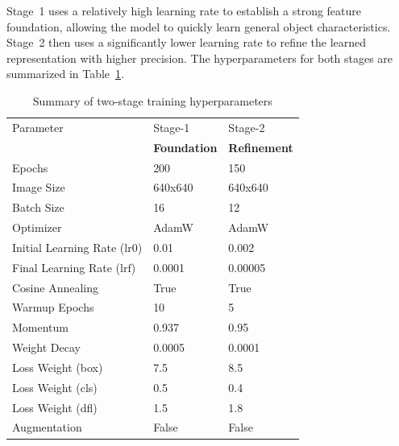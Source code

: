 \documentclass[journal,twoside,web]{ieeecolor}
\begin{document}
Stage~1 uses a relatively high learning rate to establish a strong feature foundation, allowing the model to quickly learn general object characteristics. Stage~2 then uses a significantly lower learning rate to refine the learned representation with higher precision. The hyperparameters for both stages are summarized in Table~\ref{tab:hyperparameters}. %


\begin{table}[t]
\centering
\caption{Summary of two-stage training hyperparameters}
\label{tab:hyperparameters}
\begin{tabular}{p{3cm} p{2.4cm} p{2cm}}
\toprule
{Parameter} & {Stage-1 } & {Stage-2 } \\
 & \textbf{Foundation} & \textbf{Refinement} \\
\midrule
Epochs & 200 & 150 \\
Image Size & 640x640 & 640x640 \\
Batch Size & 16 & 12 \\
Optimizer & AdamW & AdamW \\
Initial Learning Rate ($\text{lr0}$) & 0.01 & 0.002 \\
Final Learning Rate ($\text{lrf}$) & 0.0001 & 0.00005 \\
Cosine Annealing & True & True \\
Warmup Epochs & 10 & 5 \\
Momentum & 0.937 & 0.95 \\
Weight Decay & 0.0005 & 0.0001 \\
Loss Weight (box) & 7.5 & 8.5 \\
Loss Weight (cls) & 0.5 & 0.4 \\
Loss Weight (dfl) & 1.5 & 1.8 \\
Augmentation & False & False \\
\bottomrule
\end{tabular}
\end{table}
\end{document}
